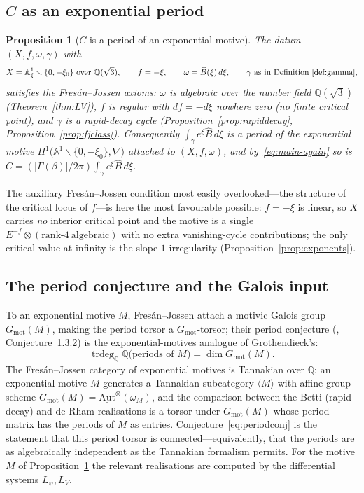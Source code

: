 \documentclass[11pt,reqno]{amsart}
\theoremstyle{plain}
\newtheorem{proposition}[theorem]{Proposition}
\theoremstyle{definition}
\newcommand{\Bhat}{\widehat{B}}
\newcommand{\Lphi}{L_{\varphi}}
\newcommand{\LV}{L_{V}}
\newcommand{\Qsqrt}{\mathbb{Q}(\sqrt3)}
\newcommand{\xizero}{\xi_0}
\providecommand{\C}{}\renewcommand{\C}{C}
\begin{document}
\subsection{$\C$ as an exponential period}
\begin{proposition}[$\C$ is a period of an exponential motive]\label{prop:expperiod}
The datum $(X,f,\omega,\gamma)$ with
\[
  X=\mathbb{A}^1_\xi\smallsetminus\{0,-\xizero\}\ \text{over }\Qsqrt,\qquad f=-\xi,\qquad
  \omega=\Bhat(\xi)\,d\xi,\qquad \gamma\ \text{as in Definition~\ref{def:gamma}},
\]
satisfies the Fres\'an--Jossen axioms: $\omega$ is algebraic over the number field $\Qsqrt$
(Theorem~\ref{thm:LV}), $f$ is regular with $df=-d\xi$ nowhere zero (no finite critical point),
and $\gamma$ is a rapid-decay cycle (Proposition~\ref{prop:rapiddecay},
Proposition~\ref{prop:fjclass}). Consequently $\int_\gamma e^{\xi}\Bhat\,d\xi$ is a period of the
exponential motive $H^1\bigl(\mathbb{A}^1\smallsetminus\{0,-\xizero\},\nabla\bigr)$ attached to
$(X,f,\omega)$, and by~\eqref{eq:main-again} so is $\C=(\lvert\Gamma(\beta)\rvert/2\pi)\int_\gamma
e^{\xi}\Bhat\,d\xi$.
\end{proposition}

The auxiliary Fres\'an--Jossen condition most easily overlooked---the structure of the critical
locus of $f$---is here the most favourable possible: $f=-\xi$ is linear, so $X$ carries \emph{no}
interior critical point and the motive is a single $E^{-f}\otimes(\text{rank-}4\ \text{algebraic})$
with no extra vanishing-cycle contributions; the only critical value at infinity is the slope-$1$
irregularity (Proposition~\ref{prop:exponents}).

\subsection{The period conjecture and the Galois input}
To an exponential motive $M$, Fres\'an--Jossen attach a motivic Galois group $G_{\mathrm{mot}}(M)$,
making the period torsor a $G_{\mathrm{mot}}$-torsor; their period conjecture
(\cite{FJ}, Conjecture~1.3.2) is the exponential-motives analogue of Grothendieck's:
\begin{equation}\label{eq:periodconj}
  \operatorname{trdeg}_{\mathbb{Q}}\mathbb{Q}\bigl(\text{periods of }M\bigr)
  =\dim G_{\mathrm{mot}}(M).
\end{equation}
The Fres\'an--Jossen category of exponential motives is Tannakian over $\mathbb{Q}$; an
exponential motive $M$ generates a Tannakian subcategory $\langle M\rangle$ with affine group
scheme $G_{\mathrm{mot}}(M)=\underline{\mathrm{Aut}}^{\otimes}(\omega_M)$, and the comparison
between the Betti (rapid-decay) and de Rham realisations is a torsor under $G_{\mathrm{mot}}(M)$
whose period matrix has the periods of $M$ as entries. Conjecture~\eqref{eq:periodconj} is the
statement that this period torsor is connected---equivalently, that the periods are as
algebraically independent as the Tannakian formalism permits. For the motive $M$ of
Proposition~\ref{prop:expperiod} the relevant realisations are computed by the differential systems
$\Lphi,\LV$.
\end{document}
